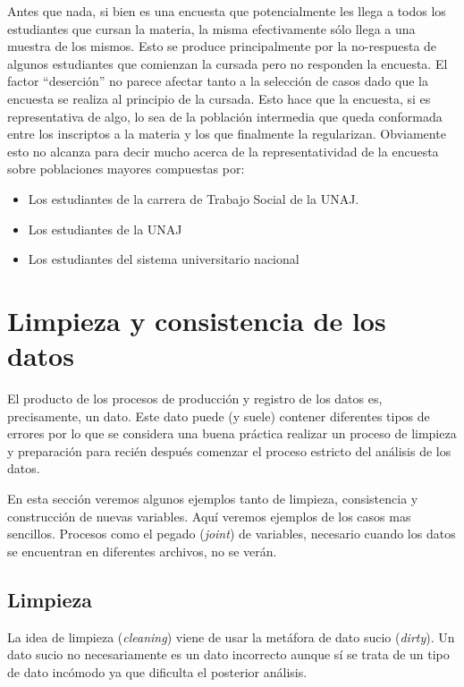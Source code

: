 \documentclass[
]{book}
\theoremstyle{definition}
\theoremstyle{definition}
\theoremstyle{definition}
\theoremstyle{definition}
\theoremstyle{remark}
\begin{document}
Antes que nada, si bien es una encuesta que potencialmente les llega a todos los estudiantes que cursan la materia, la misma efectivamente sólo llega a una muestra de los mismos. Esto se produce principalmente por la no-respuesta de algunos estudiantes que comienzan la cursada pero no responden la encuesta. El factor ``deserción'' no parece afectar tanto a la selección de casos dado que la encuesta se realiza al principio de la cursada. Esto hace que la encuesta, si es representativa de algo, lo sea de la población intermedia que queda conformada entre los inscriptos a la materia y los que finalmente la regularizan. Obviamente esto no alcanza para decir mucho acerca de la representatividad de la encuesta sobre poblaciones mayores compuestas por:

\begin{itemize}
\item
  Los estudiantes de la carrera de Trabajo Social de la UNAJ.
\item
  Los estudiantes de la UNAJ
\item
  Los estudiantes del sistema universitario nacional
\end{itemize}

\hypertarget{cross}{%
\chapter{Limpieza y consistencia de los datos}\label{cross}}

El producto de los procesos de producción y registro de los datos es, precisamente, un dato. Este dato puede (y suele) contener diferentes tipos de errores por lo que se considera una buena práctica realizar un proceso de limpieza y preparación para recién después comenzar el proceso estricto del análisis de los datos.

En esta sección veremos algunos ejemplos tanto de limpieza, consistencia y construcción de nuevas variables. Aquí veremos ejemplos de los casos mas sencillos. Procesos como el pegado (\emph{joint}) de variables, necesario cuando los datos se encuentran en diferentes archivos, no se verán.

\hypertarget{limpieza}{%
\section{Limpieza}\label{limpieza}}

La idea de limpieza (\emph{cleaning}) viene de usar la metáfora de dato sucio (\emph{dirty}). Un dato sucio no necesariamente es un dato incorrecto aunque sí se trata de un tipo de dato incómodo ya que dificulta el posterior análisis.
\end{document}
